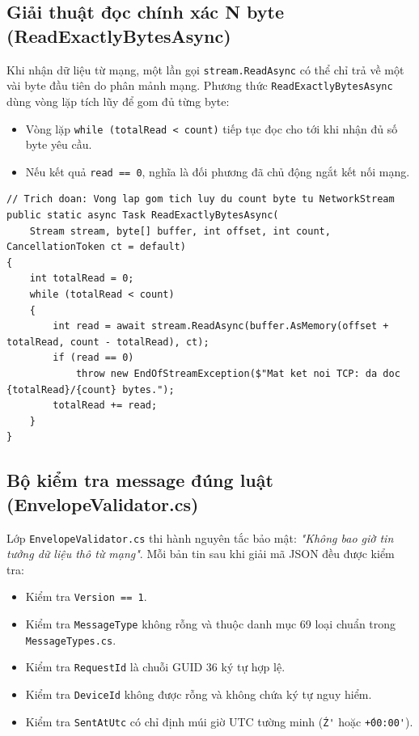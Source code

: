 \documentclass[12pt,a4paper]{article}
\begin{document}
\subsection{Giải thuật đọc chính xác N byte (ReadExactlyBytesAsync)}
Khi nhận dữ liệu từ mạng, một lần gọi \texttt{stream.ReadAsync} có thể chỉ trả về một vài byte đầu tiên do phân mảnh mạng. Phương thức \texttt{ReadExactlyBytesAsync} dùng vòng lặp tích lũy để gom đủ từng byte:

\begin{orientationbox}
\begin{itemize}[leftmargin=1.5em, itemsep=1pt]
  \item Vòng lặp \texttt{while (totalRead < count)} tiếp tục đọc cho tới khi nhận đủ số byte yêu cầu.
  \item Nếu kết quả \texttt{read == 0}, nghĩa là đối phương đã chủ động ngắt kết nối mạng.
\end{itemize}
\end{orientationbox}

\begin{lstlisting}[language=CSharp, caption={Ví dụ rút gọn dựa trên mã nguồn hiện tại: ReadExactlyBytesAsync trong FrameCodec.cs}]
// Trich doan: Vong lap gom tich luy du count byte tu NetworkStream
public static async Task ReadExactlyBytesAsync(
    Stream stream, byte[] buffer, int offset, int count, CancellationToken ct = default)
{
    int totalRead = 0;
    while (totalRead < count)
    {
        int read = await stream.ReadAsync(buffer.AsMemory(offset + totalRead, count - totalRead), ct);
        if (read == 0)
            throw new EndOfStreamException($"Mat ket noi TCP: da doc {totalRead}/{count} bytes.");
        totalRead += read;
    }
}
\end{lstlisting}

\subsection{Bộ kiểm tra message đúng luật (EnvelopeValidator.cs)}
Lớp \texttt{EnvelopeValidator.cs} thi hành nguyên tắc bảo mật: \textit{"Không bao giờ tin tưởng dữ liệu thô từ mạng"}. Mỗi bản tin sau khi giải mã JSON đều được kiểm tra:
\begin{itemize}
  \item Kiểm tra \texttt{Version == 1}.
  \item Kiểm tra \texttt{MessageType} không rỗng và thuộc danh mục 69 loại chuẩn trong \texttt{MessageTypes.cs}.
  \item Kiểm tra \texttt{RequestId} là chuỗi GUID 36 ký tự hợp lệ.
  \item Kiểm tra \texttt{DeviceId} không được rỗng và không chứa ký tự nguy hiểm.
  \item Kiểm tra \texttt{SentAtUtc} có chỉ định múi giờ UTC tường minh (\texttt{\'Z\'} hoặc \texttt{\'+00:00\'}).
\end{itemize}
\end{document}
